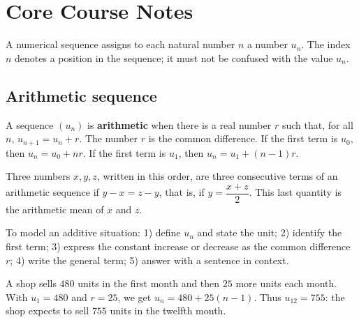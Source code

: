 

\section{Core Course Notes}
A numerical sequence assigns to each natural number $n$ a number $u_n$. The index $n$ denotes a position in the sequence; it must not be confused with the value $u_n$.

\subsection{Arithmetic sequence}
\begin{keypoint}
A sequence $(u_n)$ is \textbf{arithmetic} when there is a real number $r$ such that, for all $n$, $u_{n+1}=u_n+r$. The number $r$ is the common difference. If the first term is $u_0$, then $u_n=u_0+nr$. If the first term is $u_1$, then $u_n=u_1+(n-1)r$.
\end{keypoint}

\begin{center}
\end{center}

Three numbers $x,y,z$, written in this order, are three consecutive terms of an arithmetic sequence if $y-x=z-y$, that is, if $y=\dfrac{x+z}{2}$. This last quantity is the arithmetic mean of $x$ and $z$.

\begin{method}
To model an additive situation: 1) define $u_n$ and state the unit; 2) identify the first term; 3) express the constant increase or decrease as the common difference $r$; 4) write the general term; 5) answer with a sentence in context.
\end{method}

\begin{example}
A shop sells $480$ units in the first month and then $25$ more units each month. With $u_1=480$ and $r=25$, we get $u_n=480+25(n-1)$. Thus $u_{12}=755$: the shop expects to sell $755$ units in the twelfth month.
\end{example}


